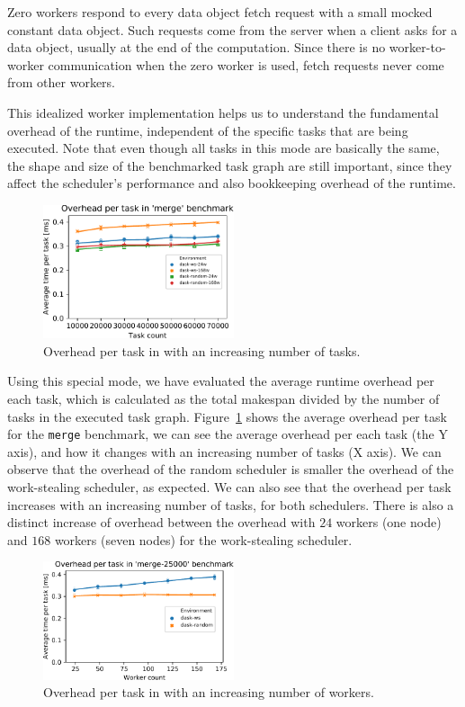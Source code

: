 Zero workers respond to every data object fetch request with a small mocked constant data object.
Such requests come from the server when a client asks for a data object, usually at the end of the
computation. Since there is no worker-to-worker communication when the zero worker is used, fetch
requests never come from other workers.

This idealized worker implementation helps us to understand the fundamental overhead of the
\dask{} runtime, independent of the specific tasks that are being executed.
Note that even though all tasks in this mode are basically the same, the shape and size of the
benchmarked task graph are still important, since they affect the scheduler's performance and also
bookkeeping overhead of the runtime.

\begin{figure}
	\centering
	\includegraphics[width=0.5\textwidth]{imgs/rsds/charts/dask-merge-task-scaling}
	\caption{Overhead per task in \dask{} with an increasing number of tasks.}
	\label{fig:dask-merge-task-scaling}
\end{figure}

Using this special mode, we have evaluated the average runtime overhead per each task, which is
calculated as the total makespan divided by the number of tasks in the executed task graph.
Figure~\ref{fig:dask-merge-task-scaling} shows the average overhead per task for the
\texttt{merge} benchmark, we can see the average overhead per each task (the Y axis),
and how it changes with an increasing number of tasks (X axis). We can observe that the overhead of
the random scheduler is smaller the overhead of the work-stealing scheduler, as expected. We can
also see that the overhead per task increases with an increasing number of tasks, for both
schedulers. There is also a distinct increase of overhead between the overhead with
$24$ workers (one node) and $168$ workers (seven nodes)
for the work-stealing scheduler.

\begin{figure}
	\centering
	\includegraphics[width=0.5\textwidth]{imgs/rsds/charts/dask-merge-worker-scaling}
	\caption{Overhead per task in \dask{} with an increasing number of workers.}
	\label{fig:dask-merge-worker-scaling}
\end{figure}

